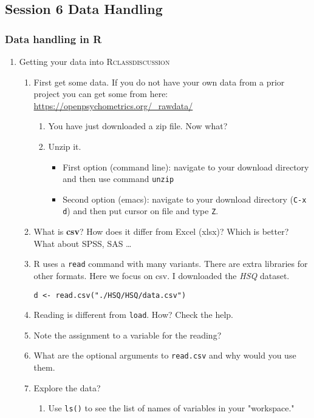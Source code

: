 \documentclass{article}
\begin{document}
\subsection{Session 6 Data Handling}
\label{sec:org5691ce0}
\subsubsection{Data handling in R}
\label{sec:orgc4f079a}
\begin{enumerate}
\item Getting your data into R\hfill{}\textsc{classdiscussion}
\label{sec:orgae75cab}
\begin{enumerate}
\item First get some data.
If you do not have your own data from a prior project you can get some from here: 
\url{https://openpsychometrics.org/\_rawdata/}
\begin{enumerate}
\item You have just downloaded  a zip file. Now what?
\item Unzip it.
\begin{itemize}
\item First option (command line): navigate to your download directory and then use command \texttt{unzip}
\item Second option (emacs): navigate to your download directory (\texttt{C-x d}) and then put cursor on file and type \texttt{Z}.
\end{itemize}
\end{enumerate}
\item What is \textbf{csv}? How does it differ from Excel (xlsx)? Which is better? What about SPSS, SAS \ldots{}
\item R uses a \texttt{read} command with many variants. There are extra libraries for other formats. Here we focus on csv. I downloaded the \emph{HSQ} dataset. 
\begin{verbatim}
d <- read.csv("./HSQ/HSQ/data.csv")
\end{verbatim}
\item Reading is different from \texttt{load}. How? Check the help.
\item Note the assignment to a variable for the reading?
\item What are the optional arguments to \texttt{read.csv} and why would you use them.
\item Explore the data?
\begin{enumerate}
\item Use \texttt{ls()} to see the list of names of variables in your "workspace."

\end{enumerate}
\end{enumerate}
\end{enumerate}
\end{document}
